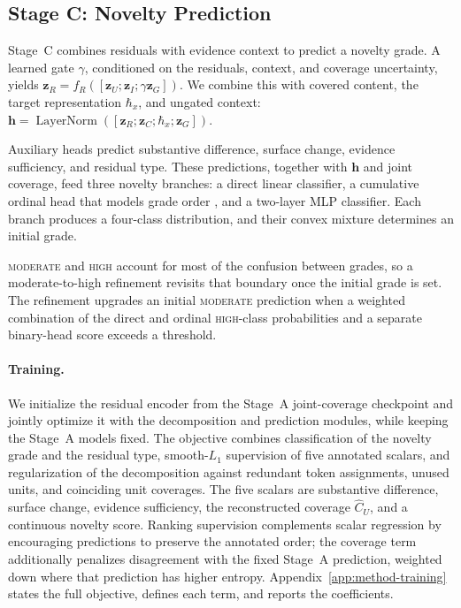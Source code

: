 \subsection{Stage C: Novelty Prediction}
\label{sec:method-prediction}

Stage~C combines residuals with evidence context to predict a novelty grade.
A learned gate $\gamma$, conditioned on the residuals, context, and coverage
uncertainty, yields
$\boldsymbol{z}_R=f_R([\boldsymbol{z}_U;\boldsymbol{z}_I;\gamma\boldsymbol{z}_G])$.
We combine this with covered content, the target representation $\hbar_x$,
and ungated context:
$\boldsymbol{h}=\operatorname{LayerNorm}([\boldsymbol{z}_R;\boldsymbol{z}_C;
\hbar_x;\boldsymbol{z}_G])$.

Auxiliary heads predict substantive difference, surface change, evidence
sufficiency, and residual type. These predictions, together with
$\boldsymbol{h}$ and joint coverage, feed three novelty branches: a direct
linear classifier, a cumulative ordinal head that models grade order
\citep{cao2020coral}, and a
two-layer MLP classifier. Each branch produces a four-class distribution, and
their convex mixture determines an initial grade.

\textsc{moderate} and \textsc{high} account for most of the confusion between
grades, so a moderate-to-high refinement revisits that boundary once the
initial grade is set. The refinement upgrades an initial \textsc{moderate}
prediction when a weighted combination of the direct and ordinal
\textsc{high}-class probabilities and a separate binary-head score exceeds a
threshold.

\paragraph{Training.}
We initialize the residual encoder from the Stage~A joint-coverage checkpoint
and jointly optimize it with the decomposition and prediction modules, while
keeping the Stage~A models fixed. The objective combines classification of the
novelty grade and the residual type, smooth-$L_1$ supervision of five
annotated scalars, and regularization of the decomposition against redundant
token assignments, unused units, and coinciding unit coverages. The five
scalars are substantive difference, surface change, evidence sufficiency,
the reconstructed coverage $\widehat C_U$, and a continuous novelty score.
Ranking supervision complements scalar regression by encouraging predictions
to preserve the annotated order; the coverage term additionally
penalizes disagreement with the fixed Stage~A prediction, weighted down where
that prediction has higher entropy.
Appendix~\ref{app:method-training} states the full objective, defines each
term, and reports the coefficients.
